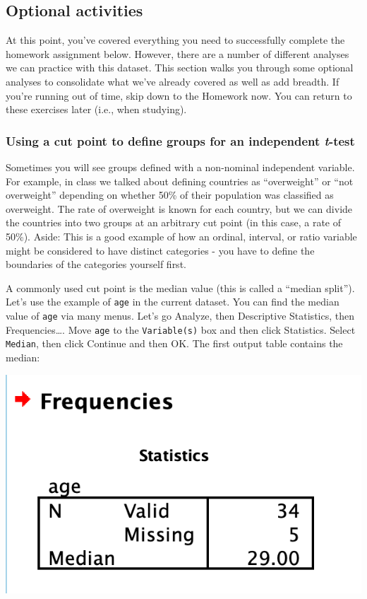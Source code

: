 \documentclass[
]{book}
\begin{document}
\hypertarget{optional-activities}{%
\subsection{Optional activities}\label{optional-activities}}

At this point, you've covered everything you need to successfully complete the homework assignment below. However, there are a number of different analyses we can practice with this dataset. This section walks you through some optional analyses to consolidate what we've already covered as well as add breadth. If you're running out of time, skip down to the Homework now. You can return to these exercises later (i.e., when studying).

\hypertarget{using-a-cut-point-to-define-groups-for-an-independent-t-test}{%
\subsubsection{\texorpdfstring{Using a cut point to define groups for an independent \emph{t}-test}{Using a cut point to define groups for an independent t-test}}\label{using-a-cut-point-to-define-groups-for-an-independent-t-test}}

Sometimes you will see groups defined with a non-nominal independent variable. For example, in class we talked about defining countries as ``overweight'' or ``not overweight'' depending on whether 50\% of their population was classified as overweight. The rate of overweight is known for each country, but we can divide the countries into two groups at an arbitrary cut point (in this case, a rate of 50\%). Aside: This is a good example of how an ordinal, interval, or ratio variable might be considered to have distinct categories - you have to define the boundaries of the categories yourself first.

A commonly used cut point is the median value (this is called a ``median split''). Let's use the example of \texttt{age} in the current dataset. You can find the median value of \texttt{age} via many menus. Let's go {Analyze}, then {Descriptive Statistics}, then {Frequencies\ldots{}}. Move \texttt{age} to the \texttt{Variable(s)} box and then click {Statistics}. Select \texttt{Median}, then click {Continue} and then {OK}. The first output table contains the median:

\includegraphics{img/7.4.23.png}
\end{document}
